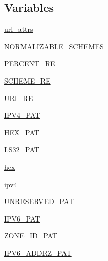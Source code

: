 \subsection*{Variables}
\begin{DoxyCompactItemize}
\item 
\hyperlink{namespacepip_1_1__vendor_1_1urllib3_1_1util_1_1url_a96239911f33965c2ce00a8cf8240e989}{url\+\_\+attrs}
\item 
\hyperlink{namespacepip_1_1__vendor_1_1urllib3_1_1util_1_1url_a99e060c3437be9ca6283ccdef2466e8f}{N\+O\+R\+M\+A\+L\+I\+Z\+A\+B\+L\+E\+\_\+\+S\+C\+H\+E\+M\+ES}
\item 
\hyperlink{namespacepip_1_1__vendor_1_1urllib3_1_1util_1_1url_a90922d0d0b11e1e82d0110d843307656}{P\+E\+R\+C\+E\+N\+T\+\_\+\+RE}
\item 
\hyperlink{namespacepip_1_1__vendor_1_1urllib3_1_1util_1_1url_a4be2c75f733be3f82b96713e71746eed}{S\+C\+H\+E\+M\+E\+\_\+\+RE}
\item 
\hyperlink{namespacepip_1_1__vendor_1_1urllib3_1_1util_1_1url_ac25b7829519ff651be626a44dd38e143}{U\+R\+I\+\_\+\+RE}
\item 
\hyperlink{namespacepip_1_1__vendor_1_1urllib3_1_1util_1_1url_a2b3e1ea08d0a62d24b8b0d7769894d95}{I\+P\+V4\+\_\+\+P\+AT}
\item 
\hyperlink{namespacepip_1_1__vendor_1_1urllib3_1_1util_1_1url_affde04a871d44753e5f1775ef6db9fd4}{H\+E\+X\+\_\+\+P\+AT}
\item 
\hyperlink{namespacepip_1_1__vendor_1_1urllib3_1_1util_1_1url_a8a1b21c1f70fa014a03a99e9b554aeb5}{L\+S32\+\_\+\+P\+AT}
\item 
\hyperlink{namespacepip_1_1__vendor_1_1urllib3_1_1util_1_1url_a51cbb070234ce992654671aec3eb5631}{hex}
\item 
\hyperlink{namespacepip_1_1__vendor_1_1urllib3_1_1util_1_1url_aad29f09ebe31ee41829cba4521e8c725}{ipv4}
\item 
\hyperlink{namespacepip_1_1__vendor_1_1urllib3_1_1util_1_1url_a74d820d5cf18a5c0813a4595071189b4}{U\+N\+R\+E\+S\+E\+R\+V\+E\+D\+\_\+\+P\+AT}
\item 
\hyperlink{namespacepip_1_1__vendor_1_1urllib3_1_1util_1_1url_a50254d95c98fdf5aa6ef4cdf539bec91}{I\+P\+V6\+\_\+\+P\+AT}
\item 
\hyperlink{namespacepip_1_1__vendor_1_1urllib3_1_1util_1_1url_a2159ae380865e2a800c968fc5d691d1d}{Z\+O\+N\+E\+\_\+\+I\+D\+\_\+\+P\+AT}
\item 
\hyperlink{namespacepip_1_1__vendor_1_1urllib3_1_1util_1_1url_aacb454816981360b9362d5ff65eb8499}{I\+P\+V6\+\_\+\+A\+D\+D\+R\+Z\+\_\+\+P\+AT}

\end{DoxyCompactItemize}
